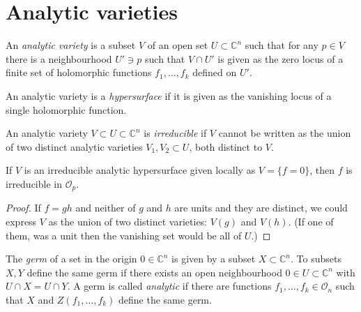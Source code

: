 \section{Analytic varieties}
\label{section-analytic-varieties}

\begin{definition}
\label{definition-analytic-variety}
An {\it analytic variety} is a subset $V$ of an open set $U\subset \mathbb{C}^n$
such that for any $p\in V$ there is a neighbourhood $U'\ni p$ such that $V\cap
U'$ is given as the zero locus of a finite set of holomorphic functions
$f_1,\ldots,f_k$ defined on $U'$.
\end{definition}

\begin{definition}
\label{definition-analytic-hypersurface}
An analytic variety is a {\it hypersurface} if it is given as the vanishing
locus of a single holomorphic function.
\end{definition}

\begin{definition}
\label{definition-irreducible-variety}
An analytic variety $V\subset U\subset \mathbb{C}^n$ is {\it irreducible} if
$V$ cannot be written as the union of two distinct analytic varieties 
$V_1,V_2\subset U$, both distinct to $V$.
\end{definition}

\begin{lemma}
\label{lemma-irreducible-analytic-hypersurface-irreducible-polynomial}
If $V$ is an irreducible analytic hypersurface given locally as $V=\{f=0\}$, 
then $f$ is irreducible in $\mathcal{O}_p$.
\end{lemma}

\begin{proof}
If $f=gh$ and neither of $g$ and $h$ are units and they are distinct, we could 
express $V$ as the union of two distinct varieties: $V(g)$ and $V(h)$. (If one 
of them, was a unit then the vanishing set would be all of $U$.)
\end{proof}

\begin{definition}
\label{definition-germ-of-set}
\begin{reference}
\cite[Definition 1.1.21]{huc}
\end{reference}
The {\it germ} of a set in the origin $0\in \mathbb{C}^n$ is given by a subset
$X \subset \mathbb{C}^n$. To subsets $X,Y$ define the same germ if there exists
an open neighbourhood $0 \in U\subset \mathbb{C}^n$ with $U\cap X=U\cap Y$. A
germ is called {\it analytic} if there are functions $f_1,\ldots,f_k\in
\mathcal{O}_n$ such that $X$ and $Z(f_1,\ldots,f_k)$ define the same germ.
\end{definition}

